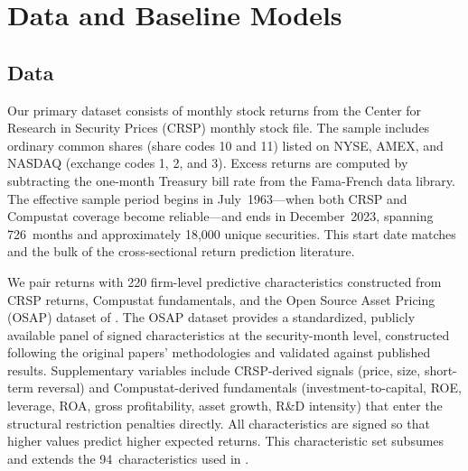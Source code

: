 
\section{Data and Baseline Models}\label{sec:empirical}

\subsection{Data}\label{sub:data}

Our primary dataset consists of monthly stock returns from the Center for Research in Security Prices (CRSP) monthly stock file.
The sample includes ordinary common shares (share codes 10 and 11) listed on NYSE, AMEX, and NASDAQ (exchange codes 1, 2, and 3).
Excess returns are computed by subtracting the one-month Treasury bill rate from the Fama-French data library.
The effective sample period begins in July~1963---when both CRSP and Compustat coverage become reliable---and ends in December~2023, spanning 726~months and approximately 18,000 unique securities.
This start date matches \citet{gu2020empirical} and the bulk of the cross-sectional return prediction literature.

We pair returns with 220 firm-level predictive characteristics constructed from CRSP returns, Compustat fundamentals, and the Open Source Asset Pricing (OSAP) dataset of \citet{jensen2023machine}.
The OSAP dataset provides a standardized, publicly available panel of signed characteristics at the security-month level, constructed following the original papers' methodologies and validated against published results.
Supplementary variables include CRSP-derived signals (price, size, short-term reversal) and Compustat-derived fundamentals (investment-to-capital, ROE, leverage, ROA, gross profitability, asset growth, R\&D intensity) that enter the structural restriction penalties directly.
All characteristics are signed so that higher values predict higher expected returns.
This characteristic set subsumes and extends the 94~characteristics used in \citet{gu2020empirical}.

